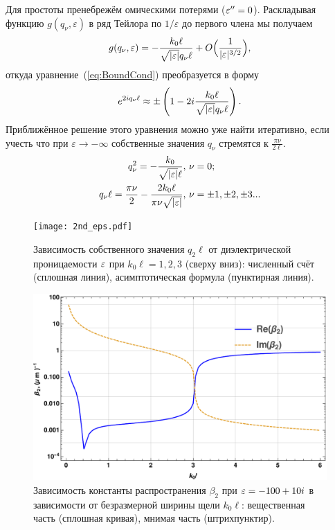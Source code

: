 Для простоты пренебрежём омическими потерями ($\varepsilon'' = 0$). Раскладывая функцию $g(q_\nu,\varepsilon)$ в ряд Тейлора по $1/\varepsilon$ до первого члена мы получаем
\begin{equation*}
g(q_\nu,\varepsilon) = -\frac{k_0 \ell}{\sqrt{\lvert\varepsilon\rvert}q_\nu \ell} + O\Big(\frac{1}{\lvert\varepsilon\rvert^{3/2}}\Big),
\end{equation*}
откуда уравнение~(\ref{eq:BoundCond}) преобразуется в форму
\begin{equation}
e^{2i q_\nu \ell} \approx \pm\left(1 - 2i\frac{k_0 \ell}{\sqrt{\lvert\varepsilon\rvert} q_\nu \ell}\right).
\label{eq:BoundCond_simple}
\end{equation}
Приближённое решение этого уравнения можно уже найти итеративно, если учесть что при $\varepsilon \to -\infty$ собственные значения
$q_\nu$ стремятся к $\frac{\pi \nu}{2 \ell}$.
\begin{align}
q_\nu^2  = -\frac{k_0}{ \sqrt{\lvert\varepsilon\rvert} \ell}, &\ \nu = 0; \nonumber \\
q_\nu \ell = \frac{\pi \nu}{2} - \frac{2k_0\ell}{\pi \nu \sqrt{\lvert\varepsilon\rvert}}, &\ \nu = \pm 1,\pm 2,\pm 3...\label{eq:Eigenvalues_approx}
\end{align}
\begin{figure}
    \begin{center}
    \texttt{[image: 2nd\_eps.pdf]}
      \caption{Зависимость собственного значения $q_2\ell$ от диэлектрической проницаемости $\varepsilon$ при $k_0 \ell = 1,2,3$ (сверху вниз):
      численный счёт (сплошная линия), асимптотическая формула (пунктирная линия).}
      \label{fig:2nd_mode}
    \end{center}
\end{figure}
\begin{figure}
    \centering
    \includegraphics[width=1.0\columnwidth]{figures/betta2_real.pdf}
    \caption{Зависимость константы распространения 
      $\beta_2$ при $\varepsilon = -100+10i$ в зависимости от безразмерной ширины щели $k_0\ell$: вещественная часть (сплошная кривая), мнимая часть (штрихпунктир).}
    \label{fig:betta2}
\end{figure}
